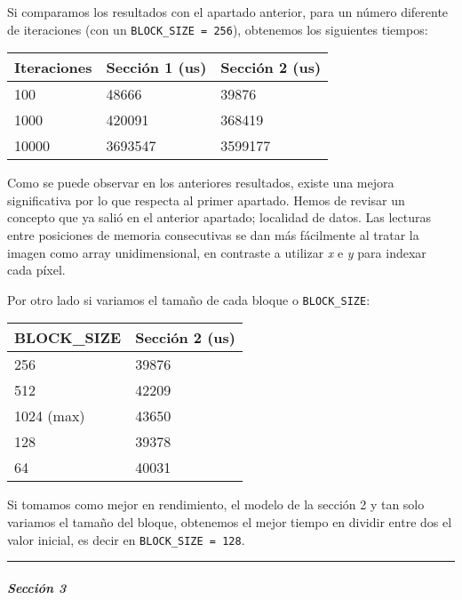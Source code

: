 \documentclass[
]{article}
\begin{document}
Si comparamos los resultados con el apartado anterior, para un número
diferente de iteraciones (con un \texttt{BLOCK\_SIZE\ =\ 256}),
obtenemos los siguientes tiempos:

\begin{longtable}[]{@{}lll@{}}
\toprule
Iteraciones & Sección 1 (us) & Sección 2 (us) \\
\midrule
\endhead
100 & 48666 & 39876 \\
1000 & 420091 & 368419 \\
10000 & 3693547 & 3599177 \\
\bottomrule
\end{longtable}

Como se puede observar en los anteriores resultados, existe una mejora
significativa por lo que respecta al primer apartado. Hemos de revisar
un concepto que ya salió en el anterior apartado; localidad de datos.
Las lecturas entre posiciones de memoria consecutivas se dan más
fácilmente al tratar la imagen como array unidimensional, en contraste a
utilizar \emph{x} e \emph{y} para indexar cada píxel.

Por otro lado si variamos el tamaño de cada bloque o
\texttt{BLOCK\_SIZE}:

\begin{longtable}[]{@{}ll@{}}
\toprule
BLOCK\_SIZE & Sección 2 (us) \\
\midrule
\endhead
256 & 39876 \\
512 & 42209 \\
1024 (max) & 43650 \\
128 & 39378 \\
64 & 40031 \\
\bottomrule
\end{longtable}

Si tomamos como mejor en rendimiento, el modelo de la sección 2 y tan
solo variamos el tamaño del bloque, obtenemos el mejor tiempo en dividir
entre dos el valor inicial, es decir en \texttt{BLOCK\_SIZE\ =\ 128}.

\begin{center}\rule{0.5\linewidth}{0.5pt}\end{center}

\hypertarget{secciuxf3n-3}{%
\subparagraph{Sección 3}\label{secciuxf3n-3}}
\end{document}
